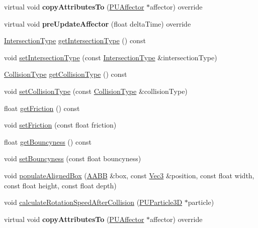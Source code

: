 \begin{DoxyCompactItemize}
\item 
\mbox{\label{classPUBaseCollider_a35b624db966a81520d8e21029e171f96}} 
virtual void {\bfseries copy\+Attributes\+To} (\hyperlink{classPUAffector}{P\+U\+Affector} $\ast$affector) override
\item 
\mbox{\label{classPUBaseCollider_a4c2a5140a029525592af7113e8422792}} 
virtual void {\bfseries pre\+Update\+Affector} (float delta\+Time) override
\item 
\hyperlink{classPUBaseCollider_ae86fc81f78c00a88e8e927377a86e81c}{Intersection\+Type} \hyperlink{classPUBaseCollider_af904a3220f053c0d5c3b83e54c91b001}{get\+Intersection\+Type} () const
\item 
void \hyperlink{classPUBaseCollider_a1871ec53e7c9932c151007f62572ab8d}{set\+Intersection\+Type} (const \hyperlink{classPUBaseCollider_ae86fc81f78c00a88e8e927377a86e81c}{Intersection\+Type} \&intersection\+Type)
\item 
\hyperlink{classPUBaseCollider_a13f646d7a12d1abb3cca3043c817e726}{Collision\+Type} \hyperlink{classPUBaseCollider_aecd3811a3af6b530f9fc005784713235}{get\+Collision\+Type} () const
\item 
void \hyperlink{classPUBaseCollider_a5c29824036f36e8ab3f2553dddb66aa1}{set\+Collision\+Type} (const \hyperlink{classPUBaseCollider_a13f646d7a12d1abb3cca3043c817e726}{Collision\+Type} \&collision\+Type)
\item 
float \hyperlink{classPUBaseCollider_a1a22cdac4632c10d249b8ad681013ac9}{get\+Friction} () const
\item 
void \hyperlink{classPUBaseCollider_a13e2ba264ed65e0c38604bf14981c38c}{set\+Friction} (const float friction)
\item 
float \hyperlink{classPUBaseCollider_a13c2ec2d478b4923cdfe3adad3449c57}{get\+Bouncyness} () const
\item 
void \hyperlink{classPUBaseCollider_a28690e04c5a9733a302f804f64a20520}{set\+Bouncyness} (const float bouncyness)
\item 
void \hyperlink{classPUBaseCollider_a070c2f0ca1a3c55774153b38baec956b}{populate\+Aligned\+Box} (\hyperlink{classAABB}{A\+A\+BB} \&box, const \hyperlink{classVec3}{Vec3} \&position, const float width, const float height, const float depth)
\item 
void \hyperlink{classPUBaseCollider_a96e9b27b4c2d2dac1bd47b7531a4598f}{calculate\+Rotation\+Speed\+After\+Collision} (\hyperlink{structPUParticle3D}{P\+U\+Particle3D} $\ast$particle)
\item 
\mbox{\label{classPUBaseCollider_a0b2e0f34b0fc5ce885d265bd2e8a4fef}} 
virtual void {\bfseries copy\+Attributes\+To} (\hyperlink{classPUAffector}{P\+U\+Affector} $\ast$affector) override
\end{DoxyCompactItemize}

